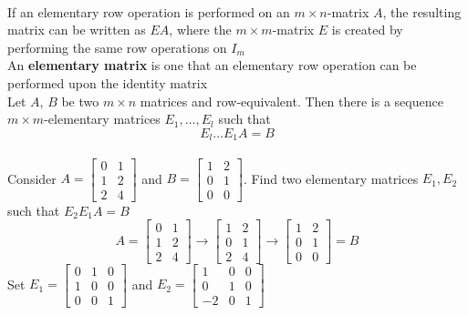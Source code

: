 \\[8pt]
If an elementary row operation is performed on an $m \times n$-matrix $A$, the 
resulting matrix can be written as $EA$, where the $m \times m$-matrix $E$ is 
created by performing the same row operations on $I_m$
\\[8pt]
An \textbf{elementary matrix} is one that an elementary row operation can be 
performed upon the identity matrix
\\[8pt]
Let $A$, $B$ be two $m \times n$ matrices and row-equivalent. Then there is a sequence $m \times m$-elementary matrices $E_1, \dots, E_l$ such that 
\[
  E_l \dots E_1A = B 
\]
\\[8pt]
Consider $A = \begin{bmatrix}
  0 & 1 \\
  1 & 2 \\
  2 & 4
\end{bmatrix}$ and $B = \begin{bmatrix}
  1 & 2 \\
  0 & 1 \\
  0 & 0
\end{bmatrix}$. Find two elementary matrices $E_1, E_2$ such that $E_2E_1A = B$ 
\[
  A = \begin{bmatrix}
    0 & 1 \\
    1 & 2 \\
    2 & 4
  \end{bmatrix} \rightarrow \begin{bmatrix}
    1 & 2 \\
    0 & 1 \\
    2 & 4
  \end{bmatrix} \rightarrow \begin{bmatrix}
    1 & 2 \\
    0 & 1 \\
    0 & 0
  \end{bmatrix} = B
\]
Set $E_1 = \begin{bmatrix}
  0 & 1 & 0 \\
  1 & 0 & 0 \\
  0 & 0 & 1
\end{bmatrix}$ and $E_2 = \begin{bmatrix}
  1 & 0 & 0 \\
  0 & 1 & 0 \\
  -2 & 0 & 1
\end{bmatrix}$
